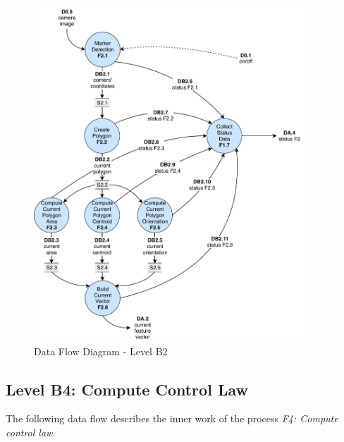 \begin{figure}[!htb]
	\centering
	\includegraphics[width=0.9\textwidth]{content/chapter_03/images/sa_diagram_04.pdf}
	\caption{Data Flow Diagram - Level B2}
	\label{fig:sa_diag_04}
\end{figure}

\pagebreak

\subsection{Level B4: Compute Control Law}
\label{sec:level-B3}

The following data flow describes the inner work of the process \textit{F4: Compute control law}.

